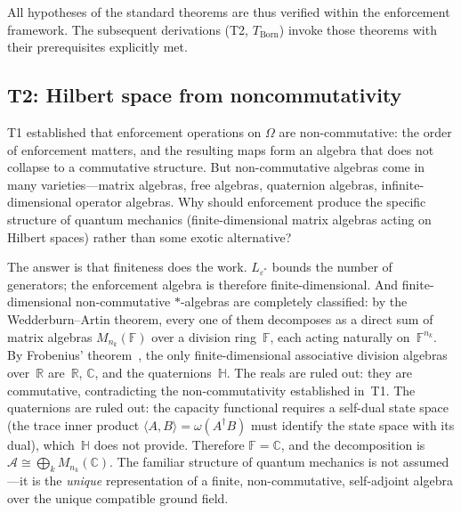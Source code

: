 \documentclass[11pt]{article}
\begin{document}
All hypotheses of the standard theorems are thus verified within the enforcement framework.  The subsequent derivations (T2, $T_{\mathrm{Born}}$) invoke those theorems with their prerequisites explicitly met.


\subsection{T2: Hilbert space from noncommutativity}

T1 established that enforcement operations on $\Omega$ are non-commutative: the order of enforcement matters, and the resulting maps form an algebra that does not collapse to a commutative structure.  But non-commutative algebras come in many varieties---matrix algebras, free algebras, quaternion algebras, infinite-dimensional operator algebras.  Why should enforcement produce the specific structure of quantum mechanics (finite-dimensional matrix algebras acting on Hilbert spaces) rather than some exotic alternative?

The answer is that finiteness does the work.  $L_{\varepsilon^*}$ bounds the number of generators; the enforcement algebra is therefore finite-dimensional.  And finite-dimensional non-commutative $*$-algebras are completely classified: by the Wedderburn--Artin theorem, every one of them decomposes as a direct sum of matrix algebras $M_{n_k}(\mathbb{F})$ over a division ring~$\mathbb{F}$, each acting naturally on~$\mathbb{F}^{n_k}$.  By Frobenius' theorem~\cite{Frobenius1878}, the only finite-dimensional associative division algebras over~$\mathbb{R}$ are~$\mathbb{R}$, $\mathbb{C}$, and the quaternions~$\mathbb{H}$.  The reals are ruled out: they are commutative, contradicting the non-commutativity established in~T1.  The quaternions are ruled out: the capacity functional requires a self-dual state space (the trace inner product $\langle A, B\rangle = \omega(A^\dagger B)$ must identify the state space with its dual), which~$\mathbb{H}$ does not provide.  Therefore $\mathbb{F} = \mathbb{C}$, and the decomposition is $\mathcal{A} \cong \bigoplus_k M_{n_k}(\mathbb{C})$.  The familiar structure of quantum mechanics is not assumed---it is the \emph{unique} representation of a finite, non-commutative, self-adjoint algebra over the unique compatible ground field.
\end{document}
